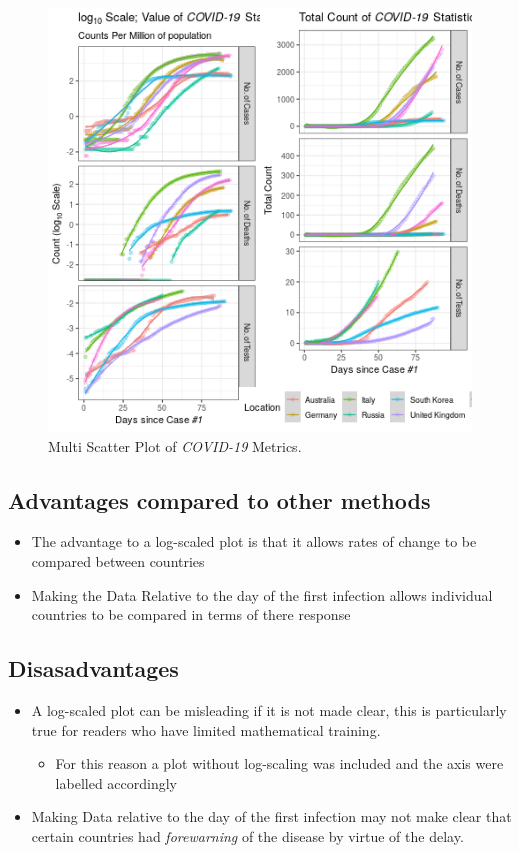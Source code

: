 \documentclass[11pt]{article}
\begin{document}
\begin{figure}[htbp]
\centering
\includegraphics[width=18cm]{fgrid.png}
\caption{\label{fig:org609b517}Multi Scatter Plot of \emph{COVID-19} Metrics.}
\end{figure}

\subsection{Advantages compared to other methods}
\label{sec:org4357022}
\begin{itemize}
\item The advantage to a log-scaled plot is that it allows rates of change to be
compared between countries
\item Making the Data Relative to the day of the first infection allows individual
countries to be compared in terms of there response
\end{itemize}
\subsection{Disasadvantages}
\label{sec:org0b3cead}
\begin{itemize}
\item A log-scaled plot can be misleading if it is not made clear, this is particularly
true for readers who have limited mathematical training.
\begin{itemize}
\item For this reason a plot without log-scaling was included and the axis were
labelled accordingly
\end{itemize}
\item Making Data relative to the day of the first infection may not make clear that
certain countries had \emph{forewarning} of the disease by virtue of the delay.
\end{itemize}
\end{document}
